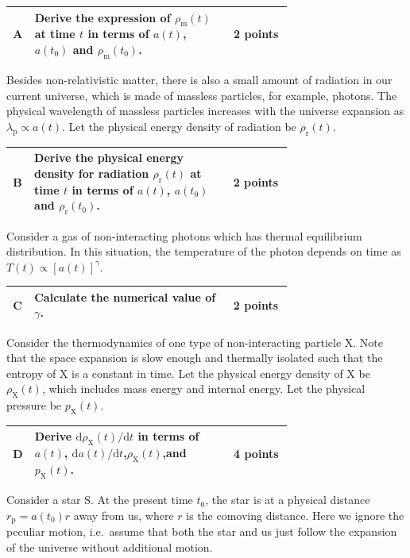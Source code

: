 \noindent\begin{tabular}{|c|p{0.7\linewidth}|c|}
\hline
\textbf{A} & Derive the expression of $\rho_\mathrm{m}(t)$ at time $t$ in terms of $a(t)$, $a(t_0)$ and $\rho_\mathrm{m}(t_0)$. & \textbf{2 points} \\
\hline
\end{tabular}

Besides non-relativistic matter, there is also a small amount of radiation in our current universe, which is made of massless particles, for example, photons. The physical wavelength of massless particles increases with the universe expansion as $\lambda_\mathrm{p} \propto a(t)$. Let the physical energy density of radiation be $\rho_\mathrm{r}(t)$.

\noindent\begin{tabular}{|c|p{0.7\linewidth}|c|}
\hline
\textbf{B} & Derive the physical energy density for radiation $\rho_\mathrm{r}(t)$ at time $t$ in terms of $a(t)$, $a(t_0)$ and $\rho_\mathrm{r}(t_0)$. & \textbf{2 points} \\
\hline
\end{tabular}

Consider a gas of non-interacting photons which has thermal equilibrium distribution. In this situation, the temperature of the photon depends on time as $T(t) \propto [a(t)]^\gamma$.

\noindent\begin{tabular}{|c|p{0.7\linewidth}|c|}
\hline
\textbf{C} & Calculate the numerical value of $\gamma$. & \textbf{2 points} \\
\hline
\end{tabular}

Consider the thermodynamics of one type of non-interacting particle X. Note that the space expansion is slow enough and thermally isolated such that the entropy of X is a constant in time. Let the physical energy density of X be $\rho_\mathrm{X}(t)$, which includes mass energy and internal energy. Let the physical pressure be $p_\mathrm{X}(t)$.

\noindent\begin{tabular}{|c|p{0.7\linewidth}|c|}
\hline
\textbf{D} & Derive $\mathrm{d}\rho_\mathrm{X}(t)/\mathrm{d}t$ in terms of $a(t)$, $\mathrm{d}a(t)/\mathrm{d}t$,$\rho_\mathrm{X}(t)$,and $p_\mathrm{X}(t)$. & \textbf{4 points} \\
\hline
\end{tabular}

Consider a star S. At the present time $t_0$, the star is at a physical distance $r_\mathrm{p} = a(t_0)r$ away from us, where $r$ is the comoving distance. Here we ignore the peculiar motion, i.e.\ assume that both the star and us just follow the expansion of the universe without additional motion.

